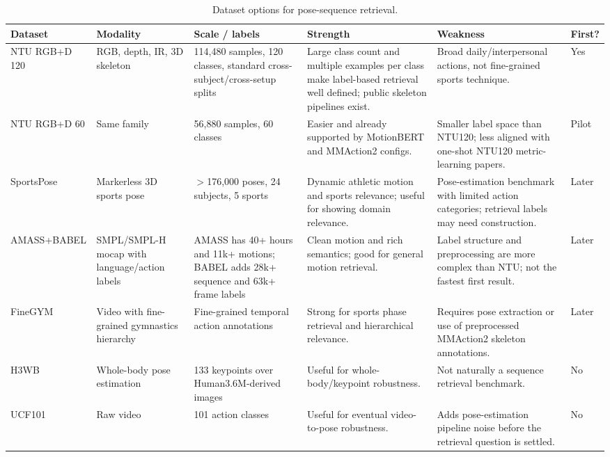 \documentclass[11pt]{article}
\begin{document}
\begin{table}[htbp]
\small
\centering
\caption{Dataset options for pose-sequence retrieval.}
\label{tab:datasets}
\begin{tabularx}{\textwidth}{@{}p{2.1cm}p{2.2cm}p{2.5cm}Y Y p{1.5cm}@{}}
\toprule
Dataset & Modality & Scale / labels & Strength & Weakness & First? \\
\midrule
NTU RGB+D 120 \citep{liu2020ntu120} & RGB, depth, IR, 3D skeleton & 114{,}480 samples, 120 classes, standard cross-subject/cross-setup splits & Large class count and multiple examples per class make label-based retrieval well defined; public skeleton pipelines exist. & Broad daily/interpersonal actions, not fine-grained sports technique. & Yes \\
NTU RGB+D 60 & Same family & 56{,}880 samples, 60 classes & Easier and already supported by MotionBERT and MMAction2 configs. & Smaller label space than NTU120; less aligned with one-shot NTU120 metric-learning papers. & Pilot \\
SportsPose \citep{ingwersen2023sportspose} & Markerless 3D sports pose & $>$176{,}000 poses, 24 subjects, 5 sports & Dynamic athletic motion and sports relevance; useful for showing domain relevance. & Pose-estimation benchmark with limited action categories; retrieval labels may need construction. & Later \\
AMASS+BABEL \citep{mahmood2019amass,punnakkal2021babel} & SMPL/SMPL-H mocap with language/action labels & AMASS has 40+ hours and 11k+ motions; BABEL adds 28k+ sequence and 63k+ frame labels & Clean motion and rich semantics; good for general motion retrieval. & Label structure and preprocessing are more complex than NTU; not the fastest first result. & Later \\
FineGYM \citep{shao2020finegym} & Video with fine-grained gymnastics hierarchy & Fine-grained temporal action annotations & Strong for sports phase retrieval and hierarchical relevance. & Requires pose extraction or use of preprocessed MMAction2 skeleton annotations. & Later \\
H3WB \citep{zhang2022h3wb} & Whole-body pose estimation & 133 keypoints over Human3.6M-derived images & Useful for whole-body/keypoint robustness. & Not naturally a sequence retrieval benchmark. & No \\
UCF101 \citep{soomro2012ucf101} & Raw video & 101 action classes & Useful for eventual video-to-pose robustness. & Adds pose-estimation pipeline noise before the retrieval question is settled. & No \\
\bottomrule
\end{tabularx}
\end{table}
\end{document}

